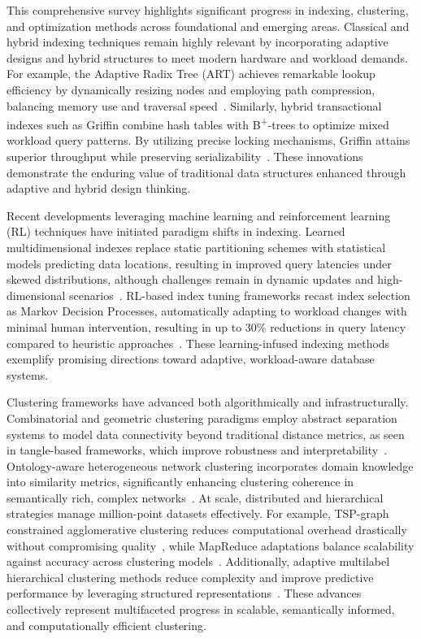 \documentclass[sigconf]{acmart}
\begin{document}
This comprehensive survey highlights significant progress in indexing, clustering, and optimization methods across foundational and emerging areas. Classical and hybrid indexing techniques remain highly relevant by incorporating adaptive designs and hybrid structures to meet modern hardware and workload demands. For example, the Adaptive Radix Tree (ART) achieves remarkable lookup efficiency by dynamically resizing nodes and employing path compression, balancing memory use and traversal speed~\cite{ref29}. Similarly, hybrid transactional indexes such as Griffin combine hash tables with B\textsuperscript{+}-trees to optimize mixed workload query patterns. By utilizing precise locking mechanisms, Griffin attains superior throughput while preserving serializability~\cite{ref35}. These innovations demonstrate the enduring value of traditional data structures enhanced through adaptive and hybrid design thinking.

Recent developments leveraging machine learning and reinforcement learning (RL) techniques have initiated paradigm shifts in indexing. Learned multidimensional indexes replace static partitioning schemes with statistical models predicting data locations, resulting in improved query latencies under skewed distributions, although challenges remain in dynamic updates and high-dimensional scenarios~\cite{ref30}. RL-based index tuning frameworks recast index selection as Markov Decision Processes, automatically adapting to workload changes with minimal human intervention, resulting in up to 30\% reductions in query latency compared to heuristic approaches~\cite{ref33}. These learning-infused indexing methods exemplify promising directions toward adaptive, workload-aware database systems.

Clustering frameworks have advanced both algorithmically and infrastructurally. Combinatorial and geometric clustering paradigms employ abstract separation systems to model data connectivity beyond traditional distance metrics, as seen in tangle-based frameworks, which improve robustness and interpretability~\cite{ref16}. Ontology-aware heterogeneous network clustering incorporates domain knowledge into similarity metrics, significantly enhancing clustering coherence in semantically rich, complex networks~\cite{ref17}. At scale, distributed and hierarchical strategies manage million-point datasets effectively. For example, TSP-graph constrained agglomerative clustering reduces computational overhead drastically without compromising quality~\cite{ref19}, while MapReduce adaptations balance scalability against accuracy across clustering models~\cite{ref18}. Additionally, adaptive multilabel hierarchical clustering methods reduce complexity and improve predictive performance by leveraging structured representations~\cite{ref20}. These advances collectively represent multifaceted progress in scalable, semantically informed, and computationally efficient clustering.
\end{document}
